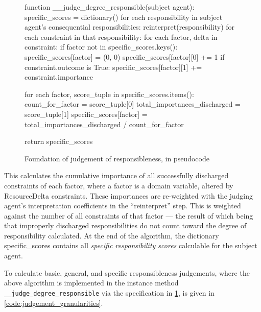 \begin{figure}[h]
    \centering
    \begin{pseudocodelisting}
    function __judge_degree_responsible(subject agent):
        specific_scores = dictionary()
        for each responsibility in subject agent's consequential responsibilities:
            reinterpret(responsibility)
            for each constraint in that responsibility:
                for each factor, delta in constraint:
                    if factor not in specific_scores.keys():
                        specific_scores[factor] = (0, 0)
                    specific_scores[factor][0] += 1
                    if constraint.outcome is True:
                        specific_scores[factor][1] += constraint.importance
                        
        for each factor, score_tuple in specific_scores.items():
            count_for_factor = score_tuple[0]
            total_importances_discharged = score_tuple[1]
            specific_scores[factor] = total_importances_discharged / count_for_factor
            
        return specific_scores
    \end{pseudocodelisting} 
    \caption{Foundation of judgement of responsibleness, in pseudocode}
    \label{code:judge_degree_responsible}
\end{figure}

This calculates the cumulative importance of all successfully discharged constraints of each factor, where a factor is a domain variable, altered by ResourceDelta constraints. These importances are re-weighted with the judging agent's interpretation coefficients in the ``reinterpret'' step. This is weighted against the number of all constraints of that factor --- the result of which being that improperly discharged responsibilities do not count toward the degree of responsibility calculated. At the end of the algorithm, the dictionary specific\_scores contains all \emph{specific responsibility scores} calculable for the subject agent.\par

To calculate basic, general, and specific responsibleness judgements, where the above algorithm is implemented in the instance method \texttt{\_\_judge\_degree\_responsible} via the specification in \cref{code:judge_degree_responsible}, is given in \cref{code:judgement_granularities}.

